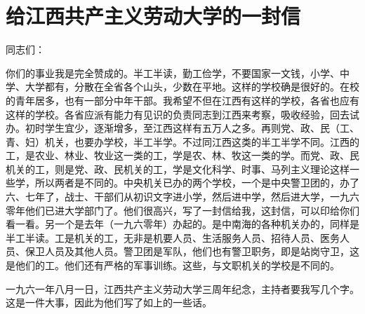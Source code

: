 \section[给江西共产主义劳动大学的一封信（一九六一年七月三十日）]{给江西共产主义劳动大学的一封信}

{\noindent 同志们：}

你们的事业我是完全赞成的。半工半读，勤工俭学，不要国家一文钱，小学、中学、大学都有，分散在全省各个山头，少数在平地。这样的学校确是很好的。在校的青年居多，也有一部分中年干部。我希望不但在江西有这样的学校，各省也应有这样的学校。各省应派有能力有见识的负责同志到江西来考察，吸收经验，回去试办。初时学生宜少，逐渐增多，至江西这样有五万人之多。再则党、政、民（工、青、妇）机关，也要办学校，半工半学。不过同江西这类的半工半学不同。江西的工，是农业、林业、牧业这一类的工，学是农、林、牧这一类的学。而党、政、民机关的工，则是党、政、民机关的工，学是文化科学、时事、马列主义理论这样一些学，所以两者是不同的。中央机关已办的两个学校，一个是中央警卫团的，办了六、七年了，战士、干部们从初识文字进小学，然后进中学，然后进大学，一九六零年他们已进大学部门了。他们很高兴，写了一封信给我，这封信，可以印给你们看一看。另一个是去年（一九六零年）办起的。是中南海的各种机关办的，同样是半工半读。工是机关的工，无非是机要人员、生活服务人员、招待人员、医务人员、保卫人员及其他人员。警卫团是军队，他们也有警卫职务，即是站岗守卫，这是他们的工。他们还有严格的军事训练。这些，与文职机关的学校是不同的。

一九六一年八月一日，江西共产主义劳动大学三周年纪念，主持者要我写几个字。这是一件大事，因此为他们写了如上的一些话。


